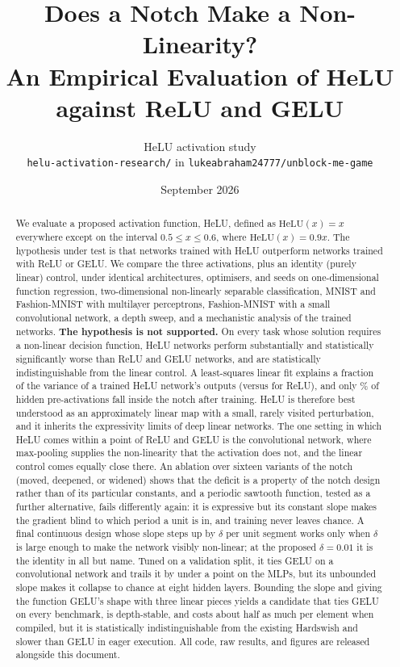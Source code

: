 \documentclass[11pt]{article}
\title{Does a Notch Make a Non-Linearity?\\
\large An Empirical Evaluation of HeLU against ReLU and GELU}
\author{HeLU activation study\\
\small \texttt{helu-activation-research/} in \texttt{lukeabraham24777/unblock-me-game}}
\date{September 2026}
\newcommand{\helu}{\mathrm{HeLU}}
\begin{document}
\maketitle

\begin{abstract}
We evaluate a proposed activation function, HeLU, defined as $\helu(x)=x$ everywhere except on the
interval $0.5\le x\le 0.6$, where $\helu(x)=0.9x$. The hypothesis under test is that networks trained
with HeLU outperform networks trained with ReLU or GELU. We compare the three activations, plus an
identity (purely linear) control, under identical architectures, optimisers, and seeds on one-dimensional
function regression, two-dimensional non-linearly separable classification, MNIST and Fashion-MNIST
with multilayer perceptrons, Fashion-MNIST with a small convolutional network, a depth sweep, and a
mechanistic analysis of the trained networks. \textbf{The hypothesis is not supported.} On every task
whose solution requires a non-linear decision function, HeLU networks perform substantially and
statistically significantly worse than ReLU and GELU networks, and are statistically indistinguishable
from the linear control. A least-squares linear fit explains a fraction \rTwoHelu{} of the variance of
a trained HeLU network's outputs (versus \rTwoRelu{} for ReLU), and only \notchHelu\% of hidden
pre-activations fall inside the notch after training. HeLU is therefore best understood as an
approximately linear map with a small, rarely visited perturbation, and it inherits the expressivity
limits of deep linear networks. The one setting in which HeLU comes within a point of ReLU and GELU is
the convolutional network, where max-pooling supplies the non-linearity that the activation does not,
and the linear control comes equally close there. An ablation over sixteen variants of the notch
(moved, deepened, or widened) shows that the deficit is a property of the notch design rather than of
its particular constants, and a periodic sawtooth function, tested as a further alternative, fails
differently again: it is expressive but its constant slope makes the gradient blind to which period a
unit is in, and training never leaves chance. A final continuous design whose slope steps up by
$\delta$ per unit segment works only when $\delta$ is large enough to make the network visibly
non-linear; at the proposed $\delta=0.01$ it is the identity in all but name. Tuned on a validation
split, it ties GELU on a convolutional network and trails it by under a point on the MLPs, but its
unbounded slope makes it collapse to chance at eight hidden layers. Bounding the slope and giving the
function GELU's shape with three linear pieces yields a candidate that ties GELU on every benchmark, is
depth-stable, and costs about half as much per element when compiled, but it is statistically
indistinguishable from the existing Hardswish and slower than GELU in eager execution. All code, raw
results, and figures are released alongside this document.
\end{abstract}
\end{document}
